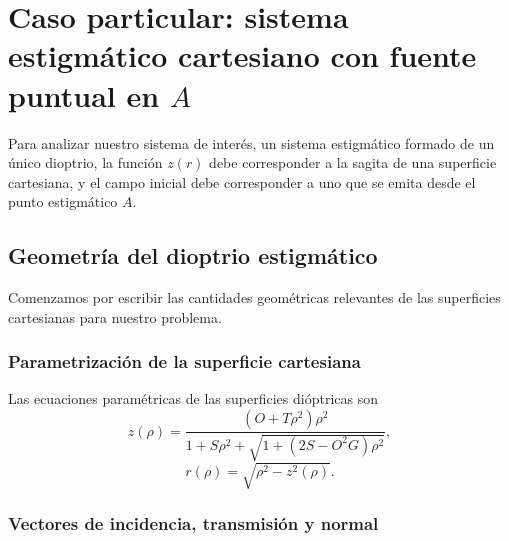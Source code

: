 \section{Caso particular: sistema estigmático cartesiano con fuente puntual en $A$}

Para analizar nuestro sistema de interés, un sistema estigmático formado de un único dioptrio, la función $z(r)$ debe corresponder a la sagita de una superficie cartesiana, y el campo inicial debe corresponder a uno que se emita desde el punto estigmático $A$.

\subsection{Geometría del dioptrio estigmático}

Comenzamos por escribir las cantidades geométricas relevantes de las superficies cartesianas para nuestro problema.

\subsubsection{Parametrización de la superficie cartesiana}

Las ecuaciones paramétricas de las superficies dióptricas son
\begin{equation}
  z(\rho)
  =
  \frac{(O + T\rho^2)\rho^2}
  {
  1 + S\rho^2 + \sqrt{1 + (2S - O^2G)\rho^2}
  },
  \label{eq:parametrical_ovoid_z_app}
\end{equation}
\begin{equation}
  r(\rho)
  =
  \sqrt{\rho^2 - z^2(\rho)}.
  \label{eq:parametrical_ovoid_r_app}
\end{equation}

\subsubsection{Vectores de incidencia, transmisión y normal}

